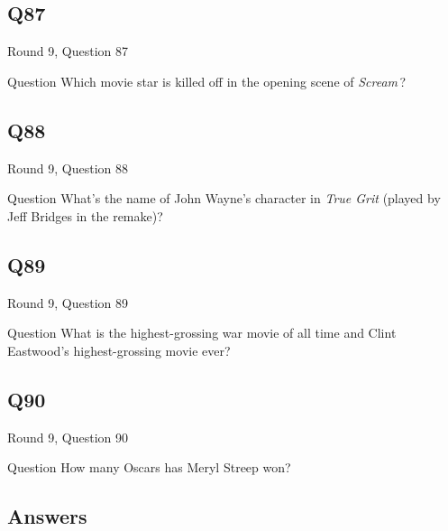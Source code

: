 \documentclass[11pt]{beamer}
\begin{document}
\subsection*{Q87}
\begin{frame}[t]{Round 9, Question 87}
\vspace{2em}
\begin{block}{Question}
Which movie star is killed off in the opening scene of \emph{Scream}\,?
\end{block}
\end{frame}
    

\subsection*{Q88}
\begin{frame}[t]{Round 9, Question 88}
\vspace{2em}
\begin{block}{Question}
What's the name of John Wayne's character in \emph{True Grit} (played by Jeff Bridges in the remake)?
\end{block}
\end{frame}
    

\subsection*{Q89}
\begin{frame}[t]{Round 9, Question 89}
\vspace{2em}
\begin{block}{Question}
What is the highest-grossing war movie of all time and Clint Eastwood's highest-grossing movie ever?
\end{block}
\end{frame}
    

\subsection*{Q90}
\begin{frame}[t]{Round 9, Question 90}
\vspace{2em}
\begin{block}{Question}
How many Oscars has Meryl Streep won?
\end{block}
\end{frame}
    
\subsection{Answers}
\end{document}

